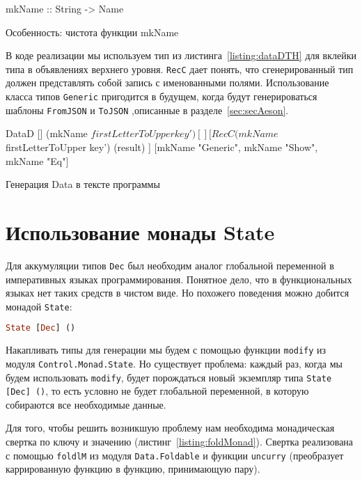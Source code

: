 \begin{ListingEnv}[H]
\begin{Verb}
mkName :: String -> Name
\end{Verb}
\caption{Особенность: чистота функции mkName}
\label{listing:mkName}
\end{ListingEnv} 

В коде реализации мы используем тип из листинга~\ref{listing:dataDTH} для вклейки типа в объявлениях верхнего уровня. \lstinline{RecC} дает понять, что сгенерированный тип должен представлять собой запись с именованными полями. Использование класса типов \lstinline{Generic} пригодится в будущем, когда будут генерироваться шаблоны \lstinline{FromJSON} и \lstinline{ToJSON} ,описанные в разделе~\ref{sec:secAeson}.

\begin{ListingEnv}[H]
\begin{Verb}
DataD
     []
     (mkName $ firstLetterToUpper key')
     []
     [ RecC (mkName $ firstLetterToUpper key')  (result) ]
     [mkName "Generic", mkName "Show", mkName "Eq"]
\end{Verb}
\caption{Генерация Data в тексте программы}
\label{listing:dataDTHjson}
\end{ListingEnv} 

\section{Использование монады State}

Для аккумуляции типов \lstinline{Dec} был необходим аналог глобальной переменной в императивных языках программирования. Понятное дело, что в функциональных языках нет таких средств в чистом виде. Но похожего поведения можно добится монадой \lstinline{State}:

\begin{lstlisting}[language=Haskell]
State [Dec] ()
\end{lstlisting}

Накапливать типы для генерации мы будем с помощью функции \lstinline{modify} из модуля \lstinline{Control.Monad.State}. Но существует проблема: каждый раз, когда мы будем использовать \lstinline{modify}, будет порождаться новый экземпляр типа \lstinline{State [Dec] ()}, то есть условно не будет глобальной переменной, в которую собираются все необходимые данные. 

Для того, чтобы решить возникшую проблему нам необходима монадическая свертка по ключу и значению (листинг~\ref{listing:foldMonad}). Свертка реализована с помощью \lstinline{foldlM} из модуля \lstinline{Data.Foldable} и функции \lstinline{uncurry} (преобразует каррированную функцию в функцию, принимающую пару).

